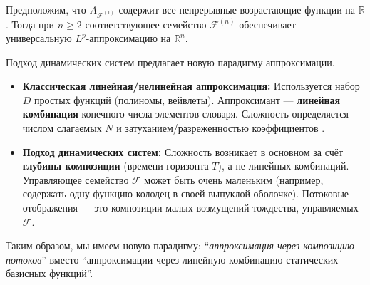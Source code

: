 \documentclass[../NDCNNAI_main.tex]{subfiles}
\begin{document}
\begin{proposition}
\label{prop:tensor_universality}
Предположим, что $A_{\mathcal{F}^{(1)}}$ содержит все непрерывные возрастающие функции на $\mathbb{R}$. Тогда при $n \geq 2$ соответствующее семейство $\mathcal{F}^{(n)}$ обеспечивает универсальную $L^p$-аппроксимацию на $\mathbb{R}^n$.
\end{proposition}

Подход динамических систем предлагает новую парадигму аппроксимации.
\begin{itemize}
    \item \textbf{Классическая линейная/нелинейная аппроксимация:} Используется набор $D$ простых функций (полиномы, вейвлеты). Аппроксимант --- \textbf{линейная комбинация} конечного числа элементов словаря. Сложность определяется числом слагаемых $N$ и затуханием/разреженностью коэффициентов \cite{DeVore1998NonlinearApproximation, Daubechies1992TenLectures, Mallat1998WaveletTour}.
    \item \textbf{Подход динамических систем:} Сложность возникает в основном за счёт \textbf{глубины композиции} (времени горизонта $T$), а не линейных комбинаций. Управляющее семейство $\mathcal{F}$ может быть очень маленьким (например, содержать одну функцию-колодец в своей выпуклой оболочке). Потоковые отображения --- это композиции малых возмущений тождества, управляемых $\mathcal{F}$.
\end{itemize}
Таким образом, мы имеем новую парадигму: ``\emph{аппроксимация через композицию потоков}'' вместо ``аппроксимации через линейную комбинацию статических базисных функций''.
\end{document}
